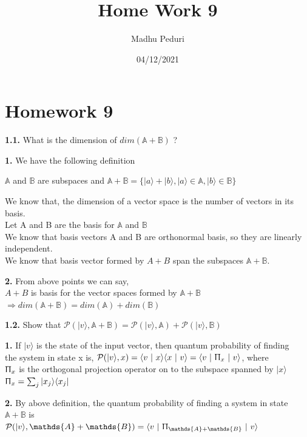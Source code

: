 \documentclass [12pt]{article}
\title{Home Work 9}
\author{Madhu Peduri}
\date{04/12/2021}
\theoremstyle{definition}
\newcommand{\ket}[1]{| {#1} \rangle}
\newcommand{\bra}[1]{\langle {#1} |}
\newcommand{\braket}[2]{\langle #1 \ | \ #2 \rangle}
\newcommand{\qp}[2]{\langle #1 \ | \ #2 \ | \ #1 \rangle}
\begin{document}
\section*{Homework 9}

{\bf 1.1.} What is the dimension of $dim(\mathds{A} + \mathds{B})$ ?

\phantom{1em} {\bf 1.} We have the following definition 

\phantom{1000em} $\mathds{A}$ and $\mathds{B}$ are subspaces and $\mathds{A} + \mathds{B} = \{ \ket{a} + \ket{b}, \ket{a} \in \mathds{A}, \ket{b} \in \mathds{B}\}$

\phantom{1000em} We know that, the dimension of a vector space is the number of vectors in its basis. \\
\phantom{1000em} Let A and B are the basis for $\mathds{A}$ and $\mathds{B}$\\
\phantom{1000em} We know that basis vectors A and B are orthonormal basis, so they are linearly independent.\\
\phantom{1000em} We know that basis vector formed by $A + B$ span the subspaces $\mathds{A} + \mathds{B}$. 

\phantom{1em} {\bf 2.} From above points we can say, \\
\phantom{1000em} $A + B$ is basis for the vector spaces formed by $\mathds{A} + \mathds{B}$\\
\phantom{1000em} $\Rightarrow dim(\mathds{A} + \mathds{B}) = dim(\mathds{A}) + dim(\mathds{B})$

{\bf 1.2.} Show that $\mathcal{P}(\ket{v}, \mathds{A} + \mathds{B}) = \mathcal{P}(\ket{v}, \mathds{A}) + \mathcal{P}(\ket{v}, \mathds{B})$

\phantom{1em} {\bf 1.} If $\ket{v}$ is the state of the input vector, then quantum probability of finding \\
\phantom{1000em} the system in state x is, $\mathcal{P}(\ket{v}, x) = \braket{v}{x}\braket{x}{v} = \qp{v}{\Uppi_{x}}$, where\\
\phantom{1000em} $\Uppi_{x}$ is the orthogonal projection operator on to the subspace spanned by $\ket{x}$\\
\phantom{1000em} $\Uppi_{x} = \sum_{j}\ket{x_{j}}\bra{x_{j}}$

\phantom{1em} {\bf 2.} By above definition, the quantum probability of finding a system in state $\mathds{A} + \mathds{B}$ is\\
\phantom{1000em} $\mathcal{P}(\ket{v}, \mathds{A} + \mathds{B}) =  \qp{v}{\Uppi_{\mathds{A} + \mathds{B}}}$
\end{document}
